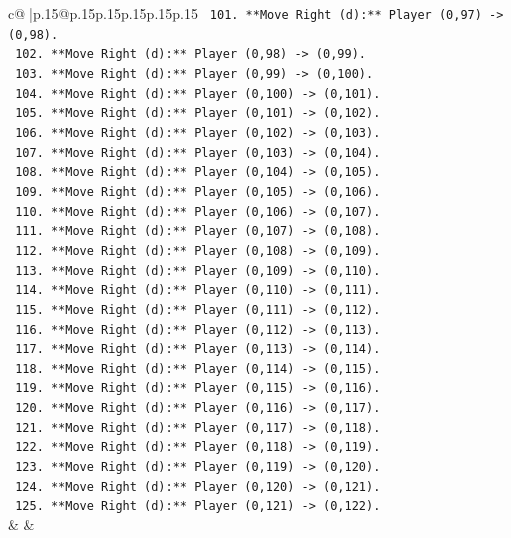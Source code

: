 \documentclass{article}
\begin{document}
{\begin{supertabular}{c@{$\;$}|p{.15\linewidth}@{}p{.15\linewidth}p{.15\linewidth}p{.15\linewidth}p{.15\linewidth}p{.15\linewidth}}
{{{\texttt{        101. **Move Right (d):** Player (0,97) {-}> (0,98).} \\
\texttt{        102. **Move Right (d):** Player (0,98) {-}> (0,99).} \\
\texttt{        103. **Move Right (d):** Player (0,99) {-}> (0,100).} \\
\texttt{        104. **Move Right (d):** Player (0,100) {-}> (0,101).} \\
\texttt{        105. **Move Right (d):** Player (0,101) {-}> (0,102).} \\
\texttt{        106. **Move Right (d):** Player (0,102) {-}> (0,103).} \\
\texttt{        107. **Move Right (d):** Player (0,103) {-}> (0,104).} \\
\texttt{        108. **Move Right (d):** Player (0,104) {-}> (0,105).} \\
\texttt{        109. **Move Right (d):** Player (0,105) {-}> (0,106).} \\
\texttt{        110. **Move Right (d):** Player (0,106) {-}> (0,107).} \\
\texttt{        111. **Move Right (d):** Player (0,107) {-}> (0,108).} \\
\texttt{        112. **Move Right (d):** Player (0,108) {-}> (0,109).} \\
\texttt{        113. **Move Right (d):** Player (0,109) {-}> (0,110).} \\
\texttt{        114. **Move Right (d):** Player (0,110) {-}> (0,111).} \\
\texttt{        115. **Move Right (d):** Player (0,111) {-}> (0,112).} \\
\texttt{        116. **Move Right (d):** Player (0,112) {-}> (0,113).} \\
\texttt{        117. **Move Right (d):** Player (0,113) {-}> (0,114).} \\
\texttt{        118. **Move Right (d):** Player (0,114) {-}> (0,115).} \\
\texttt{        119. **Move Right (d):** Player (0,115) {-}> (0,116).} \\
\texttt{        120. **Move Right (d):** Player (0,116) {-}> (0,117).} \\
\texttt{        121. **Move Right (d):** Player (0,117) {-}> (0,118).} \\
\texttt{        122. **Move Right (d):** Player (0,118) {-}> (0,119).} \\
\texttt{        123. **Move Right (d):** Player (0,119) {-}> (0,120).} \\
\texttt{        124. **Move Right (d):** Player (0,120) {-}> (0,121).} \\
\texttt{        125. **Move Right (d):** Player (0,121) {-}> (0,122).} \\
            }
        }
    }
    & & \\ \\


\end{supertabular}}
\end{document}
